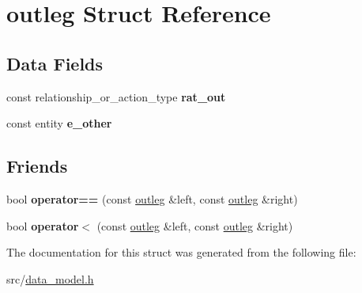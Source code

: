 \hypertarget{structoutleg}{}\section{outleg Struct Reference}
\label{structoutleg}
\subsection*{Data Fields}
\begin{DoxyCompactItemize}
\item 
const relationship\+\_\+or\+\_\+action\+\_\+type {\bfseries rat\+\_\+out}\hypertarget{structoutleg_ac6f31d14238aca57d09ddaf94cef3b68}{}\label{structoutleg_ac6f31d14238aca57d09ddaf94cef3b68}

\item 
const entity {\bfseries e\+\_\+other}\hypertarget{structoutleg_a6c75c8d4acf98324c5c4b426f9dbb664}{}\label{structoutleg_a6c75c8d4acf98324c5c4b426f9dbb664}

\end{DoxyCompactItemize}
\subsection*{Friends}
\begin{DoxyCompactItemize}
\item 
bool {\bfseries operator==} (const \hyperlink{structoutleg}{outleg} \&left, const \hyperlink{structoutleg}{outleg} \&right)\hypertarget{structoutleg_a925572d2a4bc56d312134f995f7790a5}{}\label{structoutleg_a925572d2a4bc56d312134f995f7790a5}

\item 
bool {\bfseries operator$<$} (const \hyperlink{structoutleg}{outleg} \&left, const \hyperlink{structoutleg}{outleg} \&right)\hypertarget{structoutleg_a594b6be76b1271da95305f64d3f28f52}{}\label{structoutleg_a594b6be76b1271da95305f64d3f28f52}

\end{DoxyCompactItemize}


The documentation for this struct was generated from the following file\+:\begin{DoxyCompactItemize}
\item 
src/\hyperlink{data__model_8h}{data\+\_\+model.\+h}\end{DoxyCompactItemize}
